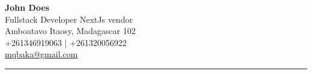 

\begin{center}
    {\LARGE \textbf{John Does}} \\[6pt]
    {\Large{Fullstack Developer NextJs vendor}}\\
    Amboatavo Itaosy, Madagascar 102 \\
    +261346919063 | +261320056922 \\
    \href{mailto:mqbaka@gmail.com}{mqbaka@gmail.com} \\[6pt]
    \rule{\textwidth}{0.4pt} %
\end{center}

    